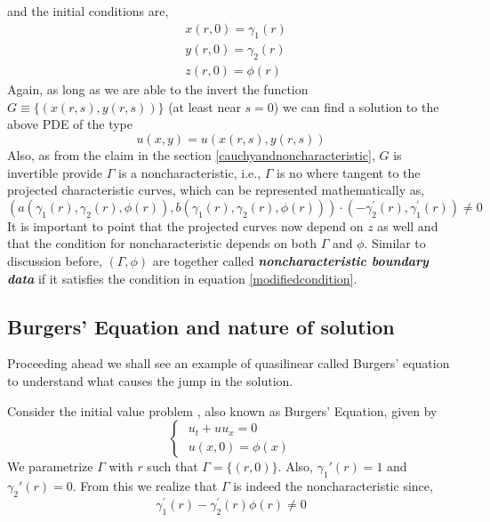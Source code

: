 \documentclass[11pt, a4paper]{report}
\begin{document}
and the initial conditions are,
\begin{equation*}
    \begin{aligned}
        & x(r, 0) = \gamma_{1}(r)\\[-0.5em]
        & y(r, 0) = \gamma_{2}(r)\\[-0.5em]
        & z(r, 0) = \phi(r)
    \end{aligned}
\end{equation*}
Again, as long as we are able to the invert the function $G\equiv \{(x(r, s), y(r, s))\}$ (at least near $s = 0$)
we can find a solution to the above PDE of the type
\begin{equation*}
    u(x, y) = u(x(r, s), y(r, s))
\end{equation*}
Also, as from the claim in the section \ref{cauchyandnoncharacteristic}, $G$ is invertible provide $\Gamma$ is a
noncharacteristic, i.e., $\Gamma$ is no where tangent to the projected characteristic curves, which can be represented
mathematically as,
\begin{equation} \label{modifiedcondition}
    \left(a\left(\gamma_{1}(r), \gamma_{2}(r), \phi(r)\right), b\left(\gamma_{1}(r), \gamma_{2}(r), \phi(r)\right)\right) \cdot \left(-\gamma_{2}^{\prime}(r), \gamma_{1}^{\prime}(r)\right) \neq 0
\end{equation}
It is important to point that the projected curves now depend on $z$ as well and that the condition for noncharacteristic
depends on both $\Gamma$ and $\phi$. Similar to discussion before, $(\Gamma, \phi)$ are together called {\emph{\bfseries
noncharacteristic boundary data}} if it satisfies the condition in equation \eqref{modifiedcondition}.

\subsection{Burgers' Equation and nature of solution}
Proceeding ahead we shall see an example of quasilinear called Burgers' equation to understand what causes the 
jump in the solution. 

Consider the initial value problem , also known as Burgers' Equation, given by
\begin{equation} \label{burgereq}
    \begin{cases}
        \; u_t + uu_x = 0\\[-0.5em] %
        \; u(x, 0) = \phi(x)
    \end{cases}
\end{equation}
We parametrize $\Gamma$ with $r$ such that $\Gamma = \{(r,0)\}$. Also, $\gamma_1{\prime}(r) = 1$ and $\gamma_2{\prime}(r) = 0$.
From this we realize that $\Gamma$ is indeed the noncharacteristic since,
\begin{equation*}
    \gamma_{1}^{\prime}(r) - \gamma_{2}^{\prime}(r)\phi(r) \neq 0
\end{equation*}
\end{document}
